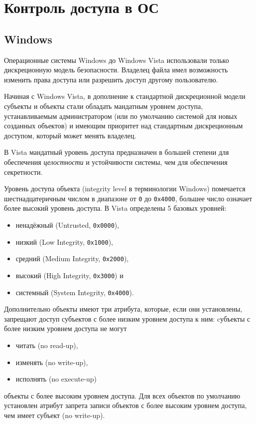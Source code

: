 \section{Контроль доступа в ОС}

\subsection{Windows}

Операционные системы Windows до Windows Vista использовали только дискреционную модель безопасности. Владелец файла имел возможность изменить права доступа или разрешить доступ другому пользователю.

Начиная с Windows Vista, в дополнение к стандартной дискреционной модели субъекты и объекты стали обладать мандатным уровнем доступа, устанавливаемым администратором (или по умолчанию системой для новых созданных объектов) и имеющим приоритет над стандартным дискреционным доступом, который может менять владелец.

В Vista мандатный уровень доступа предназначен в большей степени для обеспечения \emph{целостности} и устойчивости системы, чем для обеспечения секретности.

Уровень доступа объекта (integrity level в терминологии Windows) помечается шестнадцатеричным числом в диапазоне от \texttt{0} до \texttt{0x4000}, большее число означает более высокий уровень доступа. В Vista определены 5 базовых уровней:
\begin{itemize}
    \item ненадёжный (Untrusted, \texttt{0x0000}),
    \item низкий (Low Integrity, \texttt{0x1000}),
    \item средний (Medium Integrity, \texttt{0x2000}),
    \item высокий (High Integrity, \texttt{0x3000}) и
    \item системный (System Integrity, \texttt{0x4000}).
\end{itemize}

Дополнительно объекты имеют три атрибута, которые, если они установлены, запрещают доступ субъектов с более низким уровнем доступа к ним: cубъекты с более низким уровнем доступа не могут
\begin{itemize}
    \item читать (no read-up),
    \item изменять (no write-up),
    \item исполнять (no execute-up)
\end{itemize}
объекты с более высоким уровнем доступа. Для всех объектов по умолчанию установлен атрибут запрета записи объектов с более высоким уровнем доступа, чем имеет субъект (no write-up).

